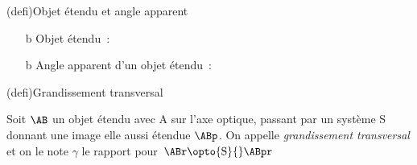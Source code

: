\documentclass[../../main/main.tex]{subfiles}
\begin{document}
\begin{tcb*}[label=def:objet](defi){Objet étendu et angle apparent}
	\begin{itemize}[label=$\diamond$, leftmargin=10pt]
		\item[b]{Objet étendu}~: %
		\item[b]{Angle apparent} d'un objet étendu~: %
	\end{itemize}
\end{tcb*}
\begin{tcb*}[label=def:grand, sidebyside](defi){Grandissement transversal}

	Soit $\AB$ un objet étendu avec A sur l'axe optique, passant par
	un système S donnant une image elle aussi étendue $\ABp$. On
	appelle \textit{grandissement transversal} et on le note $\gamma$ le
	rapport
	\psw{%
		\[
			\boxed{\gamma = \frac{\ABp}{\AB}}
		\]
	}%
	pour $\ABr \opto{\rm  S}{} \ABpr$
	\tcblower
	\begin{center}
		\vspace{-15pt}
	\end{center}
\end{tcb*}
\end{document}
